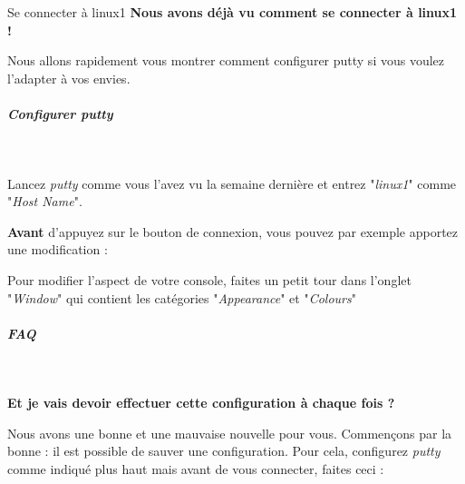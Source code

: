 \documentclass[a4paper,11pt]{article}
\begin{document}
\begin{Tutoriel}{Se connecter \`a linux1}
	\textbf{Nous avons d\'ej\`a vu comment se
		connecter \`a linux1 !}

	
	
	Nous allons rapidement vous montrer comment configurer putty 
	si vous voulez l'adapter \`a vos envies. 
	
	
		\subparagraph{Configurer putty} 

\textcolor{white}{.} \par

\par

	\begin{steps}
	
	\item 
	
	Lancez \textit{putty}
	comme vous l'avez vu la semaine derni\`ere et entrez
	"\textit{linux1}" comme
	"\textit{Host Name}".
	
	
	\item \textbf{Avant} d'appuyez
	sur le bouton de connexion, vous pouvez par exemple
	apportez une modification :  
	
	
	\begin{steps}
		
		\item 
		
		Pour modifier l'aspect de votre console,
		faites un petit tour dans l'onglet "\textit{Window}" qui
		contient les cat\'egories "\textit{Appearance}" et
		"\textit{Colours}"
		
		
	\end{steps}
	
\end{steps}

	\end{Tutoriel}

		\subparagraph{FAQ} 

\textcolor{white}{.} \par

\par
\textbf{Et je vais devoir effectuer cette configuration \`a chaque fois ?}
\par

Nous avons une bonne et une mauvaise nouvelle pour vous. 
Commen\c cons par la bonne : il est possible de sauver une configuration.  
Pour cela, configurez \textit{putty} comme indiqu\'e plus haut 
mais avant de vous connecter, faites ceci :  
\end{document}
